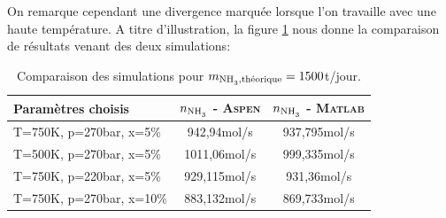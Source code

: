 On remarque cependant une divergence marquée lorsque l'on travaille 
avec une haute température. A titre d'illustration, 
la figure \ref{tab:sim} nous donne la comparaison 
de résultats venant des deux simulations:

\begin{table}[h!]
	\centering
	\begin{tabular}{l|c|c}
		Paramètres choisis & $n_{\ce{NH3}}$ - \textsc{Aspen} & $n_{\ce{NH3}}$ - \textsc{Matlab}\\
		\hline
		 T=750K, p=270bar,  x=5\% & 942,94mol/s & 937,795mol/s \\

		\hline\hline

		T=500K, p=270bar, x=5\% & 1011,06mol/s & 999,335mol/s \\

		\hline\hline

		T=750K, p=220bar, x=5\% & 929,115mol/s & 931,36mol/s \\
		
		\hline\hline
		
		T=750K, p=270bar, x=10\% & 883,132mol/s & 869,733mol/s \\
		\hline
	\end{tabular}
	\caption{Comparaison des simulations pour $m_{\ce{NH3}, \text{théorique}}=1500$t/jour.}
	\label{tab:sim}
\end{table}


